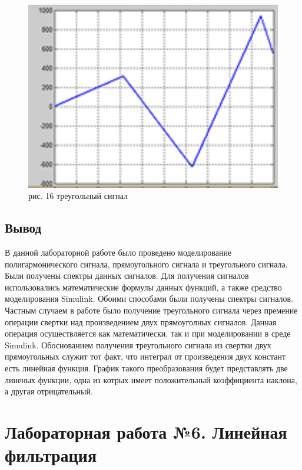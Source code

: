 \documentclass[10pt,a4paper]{report}
\begin{document}
\begin{figure}
\begin{center}
\includegraphics[angle=0, scale = 0.7]{16.png}\newline
рис. 16    треугольный сигнал\newline
\end{center}
\end{figure}


\clearpage
\section{Вывод}
В данной лабораторной работе было проведено моделирование полигармонического сигнала, прямоугольного сигнала и треугольного сигнала.
Были получены спектры данных сигналов. Для получения сигналов использовались математические формулы данных функций, а также средство моделирования Simulink. 
Обоими способами были получены спектры сигналов. Частным случаем в работе было получение треугольного сигнала через премение операции свертки над произведением 
двух прямоуголных сигналов. Данная операция осуществляется как математически, так и при моделировании в среде Simulink.
Обоснованием получения треугольного сигнала из свертки двух прямоугольных служит тот факт, что интеграл от произведения двух констант есть линейная функция. 
График такого преобразования будет представлять две линеных функции, одна из котрых имеет положительный коэффициента наклона, а другая отрицательный.

\chapter{Лабораторная работа №6. Линейная фильтрация}
\end{document}
